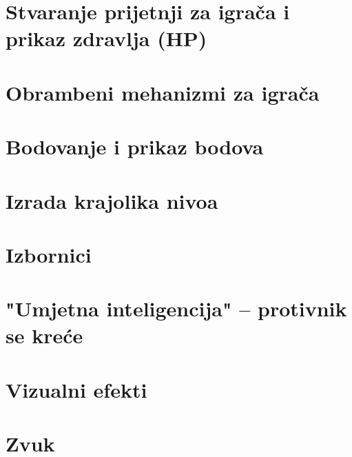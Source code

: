 \documentclass[a4paper,10pt]{article}
\begin{document}
\pagebreak
\section{Stvaranje prijetnji za igrača i prikaz zdravlja (HP)}

\pagebreak
\section{Obrambeni mehanizmi za igrača}

\pagebreak
\section{Bodovanje i prikaz bodova}

\pagebreak
\section{Izrada krajolika nivoa}

\pagebreak
\section{Izbornici}

\pagebreak
\section{"Umjetna inteligencija" -- protivnik se kreće}

\pagebreak
\section{Vizualni efekti}

\pagebreak
\section{Zvuk}

\printindex
\end{document}
